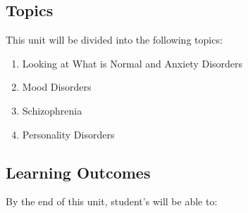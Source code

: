 \documentclass[
]{book}
\providecommand{\tightlist}{%
  \setlength{\itemsep}{0pt}\setlength{\parskip}{0pt}}
\begin{document}
\hypertarget{topics-9}{%
\subsection*{Topics}\label{topics-9}}

This unit will be divided into the following topics:

\begin{enumerate}
\def\labelenumi{\arabic{enumi}.}
\tightlist
\item
  Looking at What is Normal and Anxiety Disorders\\
\item
  Mood Disorders\\
\item
  Schizophrenia\\
\item
  Personality Disorders
\end{enumerate}

\hypertarget{learning-outcomes-9}{%
\subsection*{Learning Outcomes}\label{learning-outcomes-9}}

By the end of this unit, student's will be able to:
\end{document}
